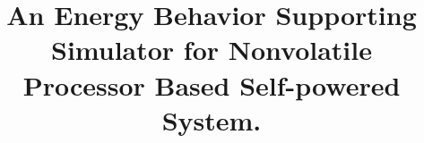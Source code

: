 \documentclass[sigconf]{acmart}
\begin{document}
\title{An Energy Behavior Supporting Simulator for Nonvolatile Processor Based Self-powered System.}

\begin{comment}
\titlenote{Produces the permission block, and
  copyright information}
\subtitle{Extended Abstract}
\subtitlenote{The full version of the author's guide is available as
  \texttt{acmart.pdf} document}
\end{comment}

\begin{comment}
\author{Ben Trovato}
\authornote{Dr.~Trovato insisted his name be first.}
\orcid{1234-5678-9012}
\affiliation{%
  \institution{Institute for Clarity in Documentation}
  \streetaddress{P.O. Box 1212}
  \city{Dublin} 
  \state{Ohio} 
  \postcode{43017-6221}
}
\email{trovato@corporation.com}
\end{comment}




\maketitle








 
\end{document}
